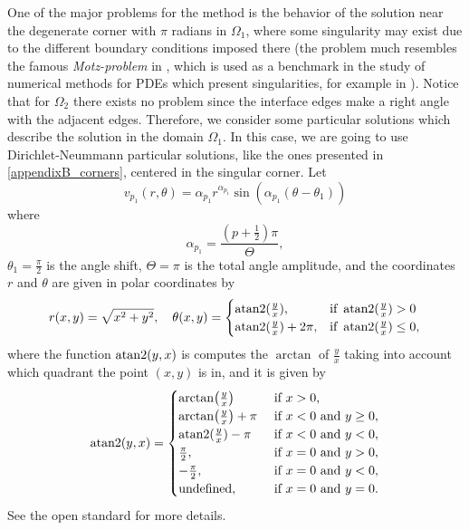 One of the major problems for the method is the behavior of the solution near the degenerate corner with \(\pi\) radians in \(\Omega_1\), where some singularity may exist due to the different boundary conditions imposed there (the problem much resembles the famous \textit{Motz-problem} in \cite{motz1947treatment}, which is used as a benchmark in the study of numerical methods for \acp{PDE} which present singularities, for example in \cite{antunes2010meshfree}). Notice that for \(\Omega_2\) there exists no problem since the interface edges make a right angle with the adjacent edges. Therefore, we consider some particular solutions which describe the solution in the domain \(\Omega_1\). In this case, we are going to use Dirichlet-Neummann particular solutions, like the ones presented in \ref{appendixB_corners}, centered in the singular corner. Let
\begin{equation}\label{pat_sol_L_shape_rect}
    v_{p_1}(r, \theta) = \alpha_{p_1} r^{\alpha_{p_1}} \sin(\alpha_{p_1}(\theta - \theta_1))
\end{equation}
where
\[
    \alpha_{p_1} = \frac{(p+\frac{1}{2})\pi}{\Theta},
\]
\(\theta_1 = \frac{\pi}{2}\) is the angle shift, \(\Theta = \pi\) is the total angle amplitude,  and the coordinates \(r\) and \(\theta\) are given in polar coordinates by
\[
    r(x,y) = \sqrt{x^2+y^2}, \quad \theta(x,y)=\begin{cases}
        \operatorname{atan2}(\frac{y}{x}),& \text{if } \operatorname{atan2}(\frac{y}{x})>0\\
        \operatorname{atan2}(\frac{y}{x})+2\pi,& \text{if } \operatorname{atan2}(\frac{y}{x})\leq0,
    \end{cases}
\]
where the function \(\operatorname{atan2}(y,x)\) is computes the \(\arctan\) of \(\frac{y}{x}\) taking into account which quadrant the point \((x, y)\) is in, and it is given by
\[
    \operatorname{atan2}(y, x) = \begin{cases}
        \arctan(\frac{y}{x}) &\text{ if } x >0,\\
        \arctan(\frac{y}{x}) + \pi &\text{ if } x < 0 \text{ and } y \geq 0,\\
        \operatorname{atan2}(\frac{y}{x}) -\pi &\text{ if } x < 0 \text{ and } y < 0,\\
        \frac{\pi}{2}, &\text{ if } x = 0 \text{ and } y > 0, \\
        -\frac{\pi}{2}, &\text{ if } x = 0 \text{ and } y < 0, \\
        \text{undefined}, &\text{ if } x = 0 \text{ and } y = 0.
    \end{cases}
\]
See the open standard \cite{jones2010wg14} for more details.
